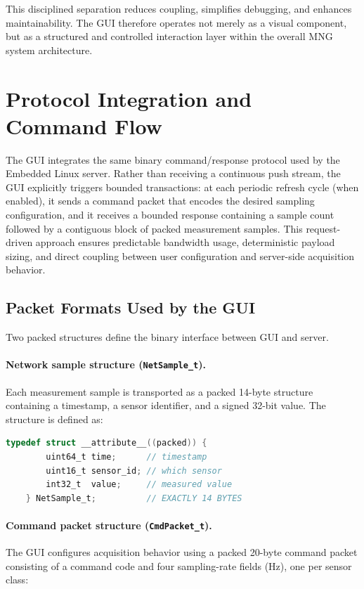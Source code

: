 This disciplined separation reduces coupling, simplifies debugging, and enhances maintainability. The GUI therefore operates not merely as a visual component, but as a structured and controlled interaction layer within the overall MNG system architecture.

\section{Protocol Integration and Command Flow}
\label{sec:gui_protocol}

The GUI integrates the same binary command/response protocol used by the Embedded Linux server. Rather than receiving a continuous push stream, the GUI explicitly triggers bounded transactions: at each periodic refresh cycle (when enabled), it sends a command packet that encodes the desired sampling configuration, and it receives a bounded response containing a sample count followed by a contiguous block of packed measurement samples. This request-driven approach ensures predictable bandwidth usage, deterministic payload sizing, and direct coupling between user configuration and server-side acquisition behavior.

\subsection{Packet Formats Used by the GUI}
\label{sec:gui_packet_formats}

Two packed structures define the binary interface between GUI and server.

\paragraph{Network sample structure (\texttt{NetSample\_t}).}
Each measurement sample is transported as a packed 14-byte structure containing a timestamp, a sensor identifier, and a signed 32-bit value. The structure is defined as:

\begin{lstlisting}[language=C]
	typedef struct __attribute__((packed)) {
		uint64_t time;      // timestamp
		uint16_t sensor_id; // which sensor
		int32_t  value;     // measured value
	} NetSample_t;          // EXACTLY 14 BYTES
\end{lstlisting}

\paragraph{Command packet structure (\texttt{CmdPacket\_t}).}
The GUI configures acquisition behavior using a packed 20-byte command packet consisting of a command code and four sampling-rate fields (Hz), one per sensor class:

